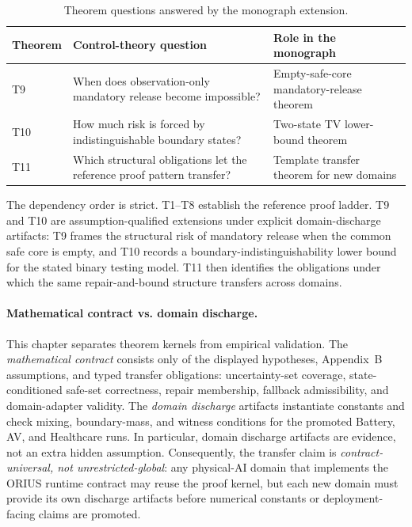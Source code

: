 \begin{table}[htbp]
\centering
\caption{Theorem questions answered by the monograph extension.}
\label{tab:universal-theorem-questions}
\begin{tabular}{p{1.5cm}p{4.7cm}p{5.1cm}}
\toprule
\textbf{Theorem} & \textbf{Control-theory question} & \textbf{Role in the monograph} \\
\midrule
T9 & When does observation-only mandatory release become impossible? & Empty-safe-core mandatory-release theorem \\
\addlinespace
T10 & How much risk is forced by indistinguishable boundary states? & Two-state TV lower-bound theorem \\
\addlinespace
T11 & Which structural obligations let the reference proof pattern transfer? & Template transfer theorem for new domains \\
\bottomrule
\end{tabular}
\end{table}

The dependency order is strict.  T1--T8 establish the reference proof
ladder.  T9 and T10 are assumption-qualified extensions under explicit
domain-discharge artifacts: T9 frames the structural risk of mandatory release
when the common safe core is empty, and T10 records a
boundary-indistinguishability lower bound for the stated binary testing model.
T11 then identifies the obligations under which
the same repair-and-bound structure transfers across domains.

\paragraph{Mathematical contract vs. domain discharge.}
This chapter separates theorem kernels from empirical validation.  The
\emph{mathematical contract} consists only of the displayed hypotheses,
Appendix~B assumptions, and typed transfer obligations: uncertainty-set
coverage, state-conditioned safe-set correctness, repair membership, fallback
admissibility, and domain-adapter validity.  The \emph{domain discharge}
artifacts instantiate constants and check mixing, boundary-mass, and witness
conditions for the promoted Battery, AV, and Healthcare runs.  In particular,
domain discharge artifacts are evidence, not an extra hidden assumption.
Consequently, the transfer claim is \emph{contract-universal, not unrestricted-global}: any physical-AI domain that implements the ORIUS runtime
contract may reuse the proof kernel, but each new domain must provide its own
discharge artifacts before numerical constants or deployment-facing claims are
promoted.

